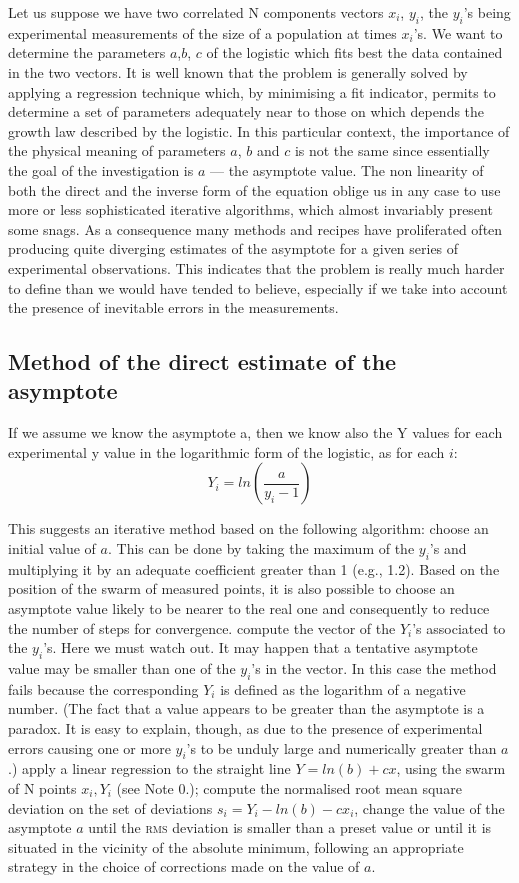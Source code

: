 \documentclass[%
 aip,
 jmp,%
 amsmath,amssymb,
 reprint,%
]{revtex4-1}
\begin{document}
Let us suppose we have two correlated N components vectors $x_i$,  $y_i$, the  $y_i$'s being experimental measurements of the size of a population at times $x_i$'s.  We want to  determine the  parameters $a$,$b$, $c$ of  the logistic which fits best the data contained in the two vectors. It is well  known that  the problem is  generally solved  by applying  a regression technique which, by  minimising a fit  indicator, permits  to determine a set of parameters adequately near to those on which  depends the growth law described by the logistic. In this particular context, the  importance of the  physical meaning  of parameters $a$, $b$ and $c$ is not the  same since essentially the goal of the investigation is  $a$ --- the asymptote value.
The non  linearity of  both  the direct  and the  inverse  form  of  the equation oblige  us in any case to use more or less sophisticated iterative algorithms, which almost invariably present some snags. As a consequence many methods and recipes have proliferated often producing quite diverging estimates of the  asymptote for a  given  series  of experimental observations. This  indicates that  the problem is really much harder to define than we  would have tended to believe, especially if we take into account the presence of inevitable errors in the measurements.

\subsection{\label{sec:level2}Method of the direct estimate of the asymptote}

If we assume we know the asymptote a, then we know  also the  Y   values for each experimental  y  value in the logarithmic form of the logistic, as for each  $i$: \[ Y_i = ln (\frac{a}{y_i - 1}) \]
	

This suggests an iterative method based on the following algorithm:
choose an initial value of $a$. This can be done by taking the  maximum of the $y_i$'s and multiplying it by an adequate coefficient greater than 1 (e.g., 1.2). Based on the position of the swarm of measured points, it is also possible to choose an asymptote value likely to be nearer to the real one and consequently to reduce the number of  steps for convergence.
compute the vector of  the $Y_i$'s  associated to the $y_i$'s. Here we must watch out. It may happen that a tentative asymptote value may be smaller than one of the $y_i$'s in the vector. In this case the  method fails because the corresponding $Y_i$ is defined as the logarithm of a negative number. (The fact that a value appears to be greater than the asymptote is a paradox. It is easy to explain, though, as due to the presence of experimental errors causing one or more $y_i$'s to be unduly large and numerically greater than $a$.)
apply a linear regression to the straight line $Y = ln(b) + cx$, using the swarm of N points $x_i, Y_i$ (see Note 0.);
compute the normalised root mean square deviation on the set of deviations $s_i =  Y_i -  ln(b) - cx_i$, change the value  of  the asymptote $a$ until the \textsc{rms} deviation is smaller than a preset value or until it is situated in the vicinity of the absolute minimum, following an appropriate strategy in the choice of corrections made on the value of $a$.
\end{document}
